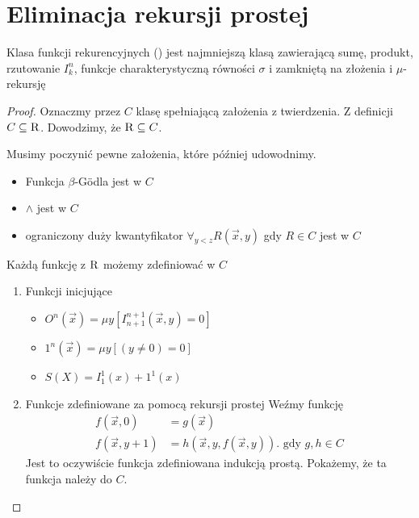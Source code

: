 \section{Eliminacja rekursji prostej}
\begin{theorem}
    Klasa funkcji rekurencyjnych (\rec) jest najmniejszą klasą zawierającą sumę, produkt, rzutowanie \(I_k^n\), funkcje charakterystyczną równości \(\sigma\) i zamkniętą na złożenia i \(\mu\)-rekursję
\end{theorem}
\begin{proof}
Oznaczmy przez \(C\) klasę spełniającą założenia z twierdzenia. Z definicji \(C \subseteq \textsc{R}\). Dowodzimy, że \(\textsc{R} \subseteq C\).

Musimy poczynić pewne założenia, które później udowodnimy.
\begin{itemize}
    \item Funkcja \(\beta\)-G\"odla jest w \(C\)
    \item \(\land\) jest w \(C\)
    \item ograniczony duży kwantyfikator \(\forall_{y<z} R(\vec{x},y)\) gdy \(R \in C\) jest w \(C\)
\end{itemize}
Każdą funkcję z \(\textsc{R}\) możemy zdefiniować w \(C\)
\begin{enumerate}
    \item Funkcji inicjujące
    \begin{itemize}
        \item \(O^n(\vec{x}) = \mu y [I_{n+1}^{n+1}(\vec{x},y) = 0]\)
        \item \(1^n(\vec{x}) = \mu y [(y\neq 0) = 0]\)
        \item \(S(X) = I_1^1(x)+1^1(x)\)
    \end{itemize}
    \item Funkcje zdefiniowane za pomocą rekursji prostej
    Weźmy funkcję
    \begin{align*}
        f(\vec{x},0)& = g(\vec{x})\\
        f(\vec{x},y+1)& = h(\vec{x},y,f(\vec{x},y)) \text{. gdy \(g,h \in C\)}
    \end{align*}
    Jest to oczywiście funkcja zdefiniowana indukcją prostą. Pokażemy, że ta funkcja należy do \(C\).


\end{enumerate}
\end{proof}
